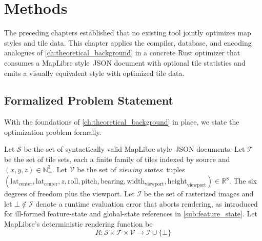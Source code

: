 \chapter{Methods}\label{ch:methods}

The preceding chapters established that no existing tool jointly optimizes map styles and tile data.
This chapter applies the compiler, database, and encoding analogues of \cref{ch:theoretical_background} in a concrete Rust optimizer that consumes a MapLibre style~\ac{JSON} document with optional tile statistics and emits a visually equivalent style with optimized tile data.

\section{Formalized Problem Statement}\label{sec:problem_statement}

With the foundations of \cref{ch:theoretical_background} in place, we state the optimization problem formally.

Let $\mathcal{S}$ be the set of syntactically valid MapLibre style~\ac{JSON} documents.\newline
Let $\mathcal{T}$ be the set of tile sets, each a finite family of tiles indexed by source and $(x, y, z) \in \mathbb{N}_+^3$.\newline
Let $\mathcal{V}$ be the set of \emph{viewing states}: tuples $(\text{lat}_\text{center}, \text{lat}_\text{center}, z, \text{roll}, \text{pitch}, \text{bearing}, \text{width}_\text{viewport}, \text{height}_\text{viewport}) \in \mathbb{R}^8$. The six degrees of freedom plus the viewport.\newline
Let $\mathcal{I}$ be the set of rasterized images and let $\bot \notin \mathcal{I}$ denote a runtime evaluation error that aborts rendering, as introduced for ill-formed feature-state and global-state references in \cref{sub:feature_state}.
Let MapLibre's deterministic rendering function be
\begin{equation}\label{eq:render_function}
    R : \mathcal{S} \times \mathcal{T} \times \mathcal{V} \to \mathcal{I} \cup \{\bot\}
\end{equation}

